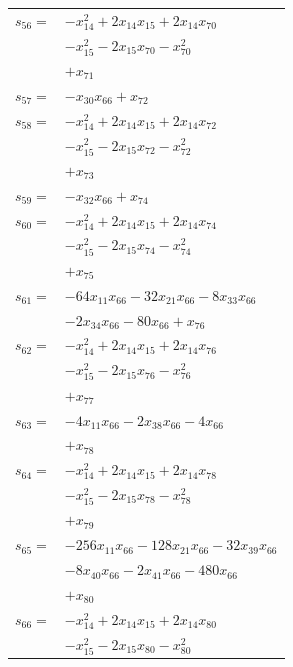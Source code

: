 \begin{longtable}{@{}r@{\;}l@{}}
\(s_{56}=\) & \(\displaystyle -x_{14}^{2} +2x_{14}x_{15} +2x_{14}x_{70}\) \\
 & \(\displaystyle -x_{15}^{2} -2x_{15}x_{70} -x_{70}^{2}\) \\
 & \(\displaystyle +x_{71}\) \\[3pt]
\(s_{57}=\) & \(\displaystyle -x_{30}x_{66} +x_{72}\) \\[3pt]
\(s_{58}=\) & \(\displaystyle -x_{14}^{2} +2x_{14}x_{15} +2x_{14}x_{72}\) \\
 & \(\displaystyle -x_{15}^{2} -2x_{15}x_{72} -x_{72}^{2}\) \\
 & \(\displaystyle +x_{73}\) \\[3pt]
\(s_{59}=\) & \(\displaystyle -x_{32}x_{66} +x_{74}\) \\[3pt]
\(s_{60}=\) & \(\displaystyle -x_{14}^{2} +2x_{14}x_{15} +2x_{14}x_{74}\) \\
 & \(\displaystyle -x_{15}^{2} -2x_{15}x_{74} -x_{74}^{2}\) \\
 & \(\displaystyle +x_{75}\) \\[3pt]
\(s_{61}=\) & \(\displaystyle -64x_{11}x_{66} -32x_{21}x_{66} -8x_{33}x_{66}\) \\
 & \(\displaystyle -2x_{34}x_{66} -80x_{66} +x_{76}\) \\[3pt]
\(s_{62}=\) & \(\displaystyle -x_{14}^{2} +2x_{14}x_{15} +2x_{14}x_{76}\) \\
 & \(\displaystyle -x_{15}^{2} -2x_{15}x_{76} -x_{76}^{2}\) \\
 & \(\displaystyle +x_{77}\) \\[3pt]
\(s_{63}=\) & \(\displaystyle -4x_{11}x_{66} -2x_{38}x_{66} -4x_{66}\) \\
 & \(\displaystyle +x_{78}\) \\[3pt]
\(s_{64}=\) & \(\displaystyle -x_{14}^{2} +2x_{14}x_{15} +2x_{14}x_{78}\) \\
 & \(\displaystyle -x_{15}^{2} -2x_{15}x_{78} -x_{78}^{2}\) \\
 & \(\displaystyle +x_{79}\) \\[3pt]
\(s_{65}=\) & \(\displaystyle -256x_{11}x_{66} -128x_{21}x_{66} -32x_{39}x_{66}\) \\
 & \(\displaystyle -8x_{40}x_{66} -2x_{41}x_{66} -480x_{66}\) \\
 & \(\displaystyle +x_{80}\) \\[3pt]
\(s_{66}=\) & \(\displaystyle -x_{14}^{2} +2x_{14}x_{15} +2x_{14}x_{80}\) \\
 & \(\displaystyle -x_{15}^{2} -2x_{15}x_{80} -x_{80}^{2}\) \\

\end{longtable}
